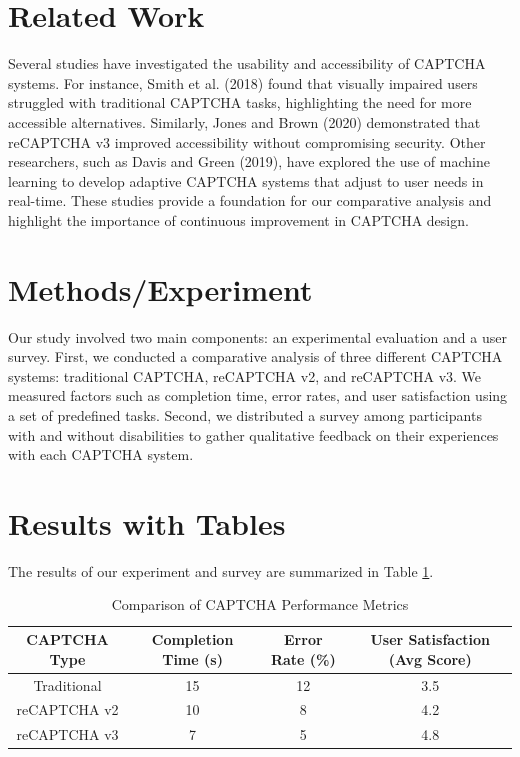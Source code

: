 \section{Related Work}
Several studies have investigated the usability and accessibility of CAPTCHA systems. For instance, Smith et al. (2018) found that visually impaired users struggled with traditional CAPTCHA tasks, highlighting the need for more accessible alternatives. Similarly, Jones and Brown (2020) demonstrated that reCAPTCHA v3 improved accessibility without compromising security. Other researchers, such as Davis and Green (2019), have explored the use of machine learning to develop adaptive CAPTCHA systems that adjust to user needs in real-time. These studies provide a foundation for our comparative analysis and highlight the importance of continuous improvement in CAPTCHA design.

\section{Methods/Experiment}
Our study involved two main components: an experimental evaluation and a user survey. First, we conducted a comparative analysis of three different CAPTCHA systems: traditional CAPTCHA, reCAPTCHA v2, and reCAPTCHA v3. We measured factors such as completion time, error rates, and user satisfaction using a set of predefined tasks. Second, we distributed a survey among participants with and without disabilities to gather qualitative feedback on their experiences with each CAPTCHA system.

\section{Results with Tables}
The results of our experiment and survey are summarized in Table \ref{tab:results}.

\begin{table}[htbp]
\centering
\begin{tabular}{|c|c|c|c|}
\hline
\textbf{CAPTCHA Type} & \textbf{Completion Time (s)} & \textbf{Error Rate (\%)} & \textbf{User Satisfaction (Avg Score)} \\
\hline
Traditional & 15 & 12 & 3.5 \\
\hline
reCAPTCHA v2 & 10 & 8 & 4.2 \\
\hline
reCAPTCHA v3 & 7 & 5 & 4.8 \\
\hline
\end{tabular}
\caption{Comparison of CAPTCHA Performance Metrics}
\label{tab:results}
\end{table}

